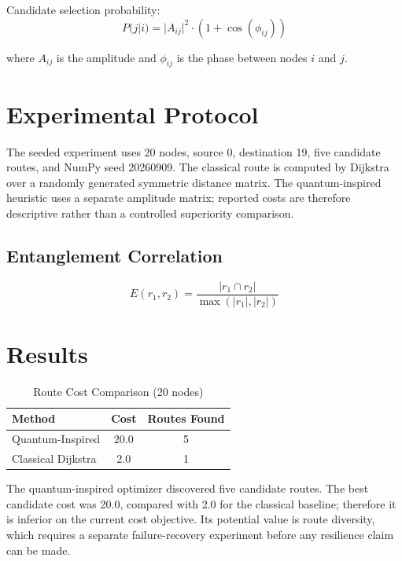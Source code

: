 \documentclass[sigconf]{acmart}
\begin{document}
Candidate selection probability:
\begin{equation}
P(j|i) = |A_{ij}|^2 \cdot (1 + \cos(\phi_{ij}))
\end{equation}

where $A_{ij}$ is the amplitude and $\phi_{ij}$ is the phase between nodes $i$ and $j$.

\section{Experimental Protocol}

The seeded experiment uses 20 nodes, source 0, destination 19, five candidate routes, and NumPy seed 20260909. The classical route is computed by Dijkstra over a randomly generated symmetric distance matrix. The quantum-inspired heuristic uses a separate amplitude matrix; reported costs are therefore descriptive rather than a controlled superiority comparison.

\subsection{Entanglement Correlation}

\begin{equation}
E(r_1, r_2) = \frac{|r_1 \cap r_2|}{\max(|r_1|, |r_2|)}
\end{equation}

\section{Results}

\begin{table}[h]
\centering
\caption{Route Cost Comparison (20 nodes)}
\begin{tabular}{lcc}
\toprule
Method & Cost & Routes Found \\
\midrule
Quantum-Inspired & 20.0 & 5 \\
Classical Dijkstra & 2.0 & 1 \\
\bottomrule
\end{tabular}
\end{table}

The quantum-inspired optimizer discovered five candidate routes. The best candidate cost was 20.0, compared with 2.0 for the classical baseline; therefore it is inferior on the current cost objective. Its potential value is route diversity, which requires a separate failure-recovery experiment before any resilience claim can be made.
\end{document}
